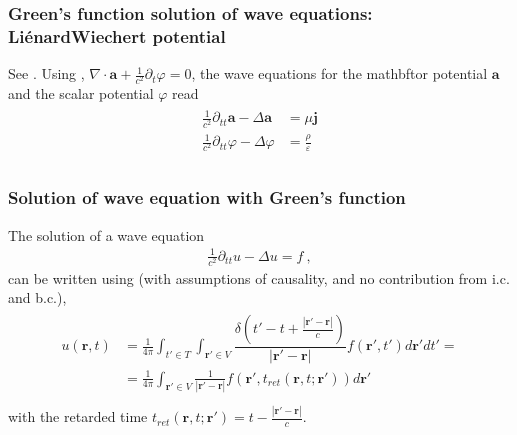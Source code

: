 \documentclass[letterpaper,10pt,english]{jupyterBook}
\begin{document}
\subsubsection{Green’s function solution of wave equations: Liénard\sphinxhyphen{}Wiechert potential}
\label{\detokenize{ch/quantum-mechanics/history/larmor-formula:green-s-function-solution-of-wave-equations-lienard-wiechert-potential}}\label{\detokenize{ch/quantum-mechanics/history/larmor-formula:moving-charge-radiation-lienard-wiechert}}
\sphinxAtStartPar
{} See . Using , \(\nabla \cdot \mathbf{a} + \frac{1}{c^2}\partial_t \varphi = 0\), the wave equations for the mathbftor potential \(\mathbf{a}\) and the scalar potential \(\varphi\) read
\begin{equation*}
\begin{split}\begin{aligned}
  \frac{1}{c^2} \partial_{tt} \mathbf{a} - \Delta \mathbf{a} & = \mu \mathbf{j} \\
  \frac{1}{c^2} \partial_{tt} \varphi - \Delta \varphi & = \frac{\rho}{\varepsilon} \\
\end{aligned}\end{split}
\end{equation*}\subsubsection*{Solution of wave equation with Green’s function}

\sphinxAtStartPar
The solution of a wave equation
\begin{equation*}
\begin{split}\frac{1}{c^2} \partial_{tt} u - \Delta u = f \ ,\end{split}
\end{equation*}
\sphinxAtStartPar
can be written using  (with assumptions of causality, and no contribution from i.c. and b.c.),
\begin{equation*}
\begin{split}\begin{aligned}
  u(\mathbf{r},t) 
  & = \frac{1}{4 \pi} \int_{t' \in T} \int_{\mathbf{r}' \in V} \dfrac{ \delta \left( t' - t + \frac{|\mathbf{r}' - \mathbf{r}|}{c} \right) }{| \mathbf{r}' - \mathbf{r} |} f (\mathbf{r}', t') d \mathbf{r}' d t' = \\
  & = \frac{1}{4 \pi} \int_{\mathbf{r}' \in V} \frac{1}{| \mathbf{r}' - \mathbf{r} |} f\left( \mathbf{r}', t_{ret}(\mathbf{r}, t; \mathbf{r}') \right)  d \mathbf{r}' \\
\end{aligned}\end{split}
\end{equation*}
\sphinxAtStartPar
with the retarded time \(t_{ret}(\mathbf{r}, t; \mathbf{r}') = t - \frac{| \mathbf{r}' - \mathbf{r} |}{c} \).
\end{document}
